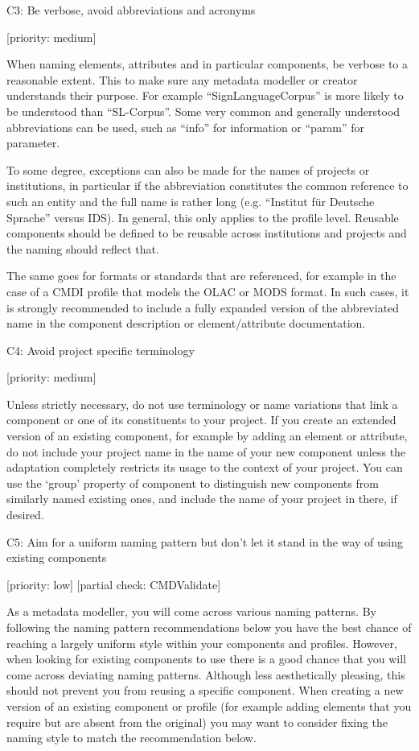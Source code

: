 C3: Be verbose, avoid abbreviations and acronyms

{[}priority: medium{]}

When naming elements, attributes and in particular components, be
verbose to a reasonable extent. This to make sure any metadata modeller
or creator understands their purpose. For example ``SignLanguageCorpus''
is more likely to be understood than ``SL-Corpus''. Some very common and
generally understood abbreviations can be used, such as ``info'' for
information or ``param'' for parameter.

To some degree, exceptions can also be made for the names of projects or
institutions, in particular if the abbreviation constitutes the common
reference to such an entity and the full name is rather long (e.g.
``Institut für Deutsche Sprache'' versus IDS). In general, this only
applies to the profile level. Reusable components should be defined to
be reusable across institutions and projects and the naming should
reflect that.

The same goes for formats or standards that are referenced, for example
in the case of a CMDI profile that models the OLAC or MODS format. In
such cases, it is strongly recommended to include a fully expanded
version of the abbreviated name in the component description or
element/attribute documentation.

C4: Avoid project specific terminology

{[}priority: medium{]}

Unless strictly necessary, do not use terminology or name variations
that link a component or one of its constituents to your project. If you
create an extended version of an existing component, for example by
adding an element or attribute, do not include your project name in the
name of your new component unless the adaptation completely restricts
its usage to the context of your project. You can use the `group'
property of component to distinguish new components from similarly named
existing ones, and include the name of your project in there, if
desired.

C5: Aim for a uniform naming pattern but don't let it stand in the way
of using existing components

{[}priority: low{]} {[}partial check: CMDValidate{]}

As a metadata modeller, you will come across various naming patterns. By
following the naming pattern recommendations below you have the best
chance of reaching a largely uniform style within your components and
profiles. However, when looking for existing components to use there is
a good chance that you will come across deviating naming patterns.
Although less aesthetically pleasing, this should not prevent you from
reusing a specific component. When creating a new version of an existing
component or profile (for example adding elements that you require but
are absent from the original) you may want to consider fixing the naming
style to match the recommendation below.


